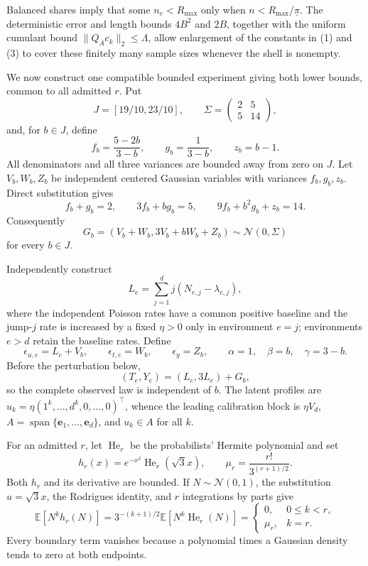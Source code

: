 Balanced shares imply that some \(n_e<R_{\max}\) only when \(n<R_{\max}/\underline\pi\).  The deterministic error and length bounds \(4B^2\) and \(2B\), together with the uniform cumulant bound \(\|Q_Ac_k\|_2\leq\Lambda\), allow enlargement of the constants in (1) and (3) to cover these finitely many sample sizes whenever the shell is nonempty.

We now construct one compatible bounded experiment giving both lower bounds, common to all admitted \(r\).  Put
\[
 J=[19/10,23/10],
 \qquad \Sigma=\begin{pmatrix}2&5\\5&14\end{pmatrix},
\]
and, for \(b\in J\), define
\[
 f_b=\frac{5-2b}{3-b},\qquad
 g_b=\frac1{3-b},\qquad z_b=b-1.                                         \tag{19}
\]
All denominators and all three variances are bounded away from zero on \(J\).  Let \(V_b,W_b,Z_b\) be independent centered Gaussian variables with variances \(f_b,g_b,z_b\).  Direct substitution gives
\[
 f_b+g_b=2,
 \qquad3f_b+bg_b=5,
 \qquad9f_b+b^2g_b+z_b=14.                                                \tag{20}
\]
Consequently
\[
 G_b=(V_b+W_b,3V_b+bW_b+Z_b)\sim\mathcal N(0,\Sigma)                     \tag{21}
\]
for every \(b\in J\).

Independently construct
\[
 L_e=\sum_{j=1}^d j(N_{e,j}-\lambda_{e,j}),
\]
where the independent Poisson rates have a common positive baseline and the jump-\(j\) rate is increased by a fixed \(\eta>0\) only in environment \(e=j\); environments \(e>d\) retain the baseline rates.  Define
\[
 \epsilon_{u,e}=L_e+V_b,\qquad
 \epsilon_{t,e}=W_b,\qquad
 \epsilon_y=Z_b,\qquad
 \alpha=1,\quad\beta=b,\quad\gamma=3-b.                                 \tag{22}
\]
Before the perturbation below,
\[
 (T_e,Y_e)=(L_e,3L_e)+G_b,                                                 \tag{23}
\]
so the complete observed law is independent of \(b\).  The latent profiles are \(u_k=\eta(1^k,\ldots,d^k,0,\ldots,0)^\top\), whence the leading calibration block is \(\eta V_d\), \(A=\operatorname{span}\{\mathbf e_1,\ldots,\mathbf e_d\}\), and \(u_k\in A\) for all \(k\).

For an admitted \(r\), let \(\operatorname{He}_r\) be the probabilists' Hermite polynomial and set
\[
 h_r(x)=e^{-x^2}\operatorname{He}_r(\sqrt3x),
 \qquad \mu_r=\frac{r!}{3^{(r+1)/2}}.                                    \tag{24}
\]
Both \(h_r\) and its derivative are bounded.  If \(N\sim\mathcal N(0,1)\), the substitution \(u=\sqrt3x\), the Rodrigues identity, and \(r\) integrations by parts give
\[
 \mathbb E[N^kh_r(N)]
 =3^{-(k+1)/2}\mathbb E[N^k\operatorname{He}_r(N)]
 =\begin{cases}0,&0\leq k<r,\\ \mu_r,&k=r.\end{cases}                   \tag{25}
\]
Every boundary term vanishes because a polynomial times a Gaussian density tends to zero at both endpoints.

